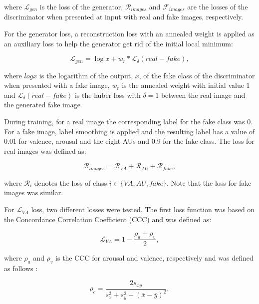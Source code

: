 \documentclass[a4paper, 10pt, conference]{ieeeconf}      %
\begin{document}
\noindent
where $\mathcal{L}_{gen}$ is the loss of the generator, $\mathcal{R}_{images}$ and  $\mathcal{F}_{images}$ are the losses of the discriminator when presented at input with real and fake images, respectively.

For the generator loss, a reconstruction loss with an annealed weight is applied as an auxiliary loss to help the generator get rid of the initial local minimum:

\vskip -0.3cm

\begin{equation} \label{eq_2}
\mathcal{L}_{gen} = \log x + w_{r} * \mathcal{L}_{\delta}(real-fake),
\end{equation}

where $logx$ is the logarithm of the output, $x$, of the fake class of the discriminator when  presented with a fake image, $w_r$ is the annealed weight with initial value $1$ and $\mathcal{L}_{\delta}(real-fake)$ is the huber loss \cite{huber1964robust} with $\delta = 1$ between the real image and the generated fake image.

During training, for a real image the corresponding label for the fake class was 0. For a fake image, label smoothing is applied and the resulting label has a value of 0.01 for valence, arousal and the eight AUs and 0.9 for the fake class. The loss for real images was defined as:

\vskip -0.3cm

\begin{equation} \label{eq_3}
\mathcal{R}_{images} = \mathcal{R}_{VA} + \mathcal{R}_{AU} + \mathcal{R}_{fake} , 
\end{equation}

where $\mathcal{R}_{i}$ denotes the loss of class $i \in \{VA,AU,fake\} $. Note that the loss for fake images was similar.

For $\mathcal{L}_{VA}$ loss, two different losses were tested.
The first loss function was based on the Concordance Correlation Coefficient (CCC) and was defined as:

\begin{equation} \label{eq_4}
\mathcal{L}_{VA} = 1 - \frac{\rho_a + \rho_v}{2},
\end{equation}

where $\rho_a$ and $\rho_v$ is the CCC for arousal and valence, respectively and was defined as follows  :

\begin{equation} \label{eq_5}
\rho_c = \frac{2 s_{xy}}{s_x^2 + s_y^2 + (\bar{x} - \bar{y})^2},
\end{equation}
\end{document}
